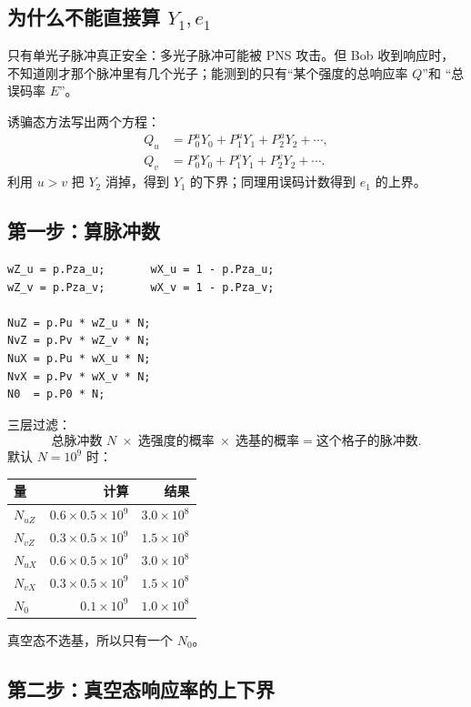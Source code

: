 \documentclass[UTF8,11pt,a4paper]{ctexart}
\begin{document}
\subsection{为什么不能直接算 $Y_1,e_1$}

只有单光子脉冲真正安全：多光子脉冲可能被 PNS 攻击。但 Bob 收到响应时，
不知道刚才那个脉冲里有几个光子；能测到的只有“某个强度的总响应率 $Q$”和
“总误码率 $E$”。

诱骗态方法写出两个方程：
\begin{align}
Q_u&=P_0^uY_0+P_1^uY_1+P_2^uY_2+\cdots,\\
Q_v&=P_0^vY_0+P_1^vY_1+P_2^vY_2+\cdots.
\end{align}
利用 $u>v$ 把 $Y_2$ 消掉，得到 $Y_1$ 的下界；同理用误码计数得到 $e_1$ 的上界。

\subsection{第一步：算脉冲数}

\begin{lstlisting}
wZ_u = p.Pza_u;       wX_u = 1 - p.Pza_u;
wZ_v = p.Pza_v;       wX_v = 1 - p.Pza_v;

NuZ = p.Pu * wZ_u * N;
NvZ = p.Pv * wZ_v * N;
NuX = p.Pu * wX_u * N;
NvX = p.Pv * wX_v * N;
N0  = p.P0 * N;
\end{lstlisting}

三层过滤：
\[
\text{总脉冲数 }N\;\times\;\text{选强度的概率}\;\times\;\text{选基的概率}
=\text{这个格子的脉冲数}.
\]
默认 $N=10^9$ 时：

\begin{center}
\begin{tabular}{@{}lrr@{}}
\toprule
量 & 计算 & 结果\\
\midrule
$N_{uZ}$ & $0.6\times0.5\times10^9$ & $3.0\times10^8$\\
$N_{vZ}$ & $0.3\times0.5\times10^9$ & $1.5\times10^8$\\
$N_{uX}$ & $0.6\times0.5\times10^9$ & $3.0\times10^8$\\
$N_{vX}$ & $0.3\times0.5\times10^9$ & $1.5\times10^8$\\
$N_0$ & $0.1\times10^9$ & $1.0\times10^8$\\
\bottomrule
\end{tabular}
\end{center}

真空态不选基，所以只有一个 $N_0$。

\subsection{第二步：真空态响应率的上下界}
\end{document}
